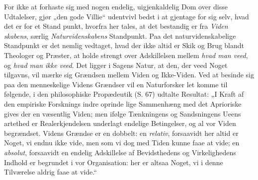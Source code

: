 \documentclass[12pt]{book}
\newcommand{\opage}[1]{\marginnote{\footnotesize\textit{[#1]}}}
\begin{document}
For ikke at forhaste sig med nogen endelig, uigjenkaldelig
Dom over disse Udtalelser, gjør „den gode Villie“ udentvivl
bedst i at gjentage for sig selv, hvad det er for et Stand\-%
punkt, hvorfra her tales, at det bestandig er fra \emph{Viden\-%
skabens}, særlig \emph{Naturvidenskabens} Standpunkt. Paa det
naturvidenskabelige Standpunkt er det nemlig vedtaget, hvad
der ikke altid er Skik og Brug blandt Theologer og Præster,
at holde strengt over Adskillelsen mellem \emph{hvad man veed},
og \emph{hvad man ikke veed}. Det ligger i Sagens Natur,
\opage{28}\setcounter{footnote}{0}%
at den, der veed Noget tilgavns, vil mærke sig Grændsen
mellem Viden og Ikke-Viden. Ved at besinde sig paa den
menneskelige Videns Grændser vil en Naturforsker let komme
til følgende, i den philosophiske Propædeutik (S. 67) udtalte
Resultat: „I Kraft af den empiriske Forsknings indre oprinde\-%
lige Sammenhæng med det Aprioriske gives der en væsentlig
Viden; men ifølge Tænkningens og Sandsningens Ueens\-%
artethed er Realerkjendelsen underlagt endelige Betingelser, og
al vor Viden begrændset. Videns Grændse er en dobbelt:
en \emph{relativ}, forsaavidt her altid er Noget, vi endnu ikke
vide, men som vi dog med Tiden kunne faae at vide; en
\emph{absolut}, forsaavidt en endelig Adskillelse af Bevidsthedens
og Virkelighedens Indhold er begrundet i vor Organisation:
her er altsaa Noget, vi i denne Tilværelse aldrig faae at
vide.“
\end{document}
